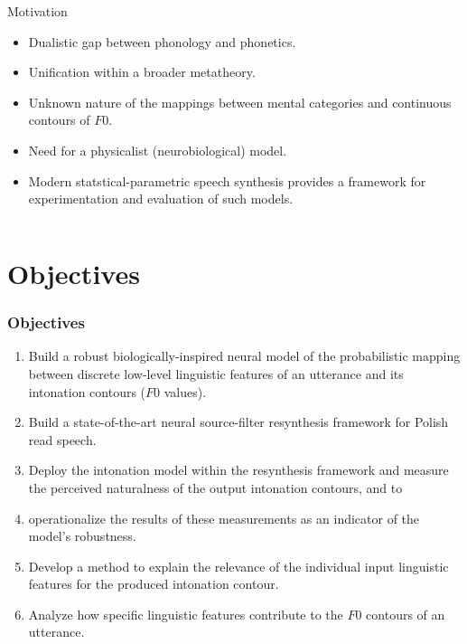 \documentclass[a4paper,9pt]{beamer}
\theoremstyle{mytheoremstyle}
\begin{document}
\begin{frame}
\begin{columns}
\begin{exampleblock}{Motivation}
\begin{itemize}
\item[\checkmark] Dualistic gap between phonology and phonetics.
\item[\checkmark] Unification within a broader metatheory.
\item[\checkmark] Unknown nature of the mappings between mental categories and continuous contours of $F0$.
\item[\checkmark] Need for a physicalist (neurobiological) model.
\item[\checkmark] Modern statstical-parametric speech synthesis provides a framework for experimentation and evaluation of such models.
\end{itemize}
\end{exampleblock}
\end{columns}
\end{frame}



\section{Objectives}
\begin{frame}
\frametitle{Objectives}
\begin{enumerate}
\item<1-2> Build a robust biologically-inspired neural model of the probabilistic mapping between discrete low-level linguistic features of an utterance and its intonation contours ($F0$ values).
\item<2> Build a state-of-the-art neural source-filter resynthesis framework for Polish read speech.
\item<2> Deploy the intonation model within the resynthesis framework and measure the perceived naturalness of the output intonation contours, and to
\item<2> operationalize the results of these measurements as an indicator of the model's robustness.
\item<2> Develop a method to explain the relevance of the individual input linguistic features for the produced intonation contour.
\item<1-2> Analyze how specific linguistic features contribute to the $F0$ contours of an utterance.
\end{enumerate}
\end{frame}
\end{document}
